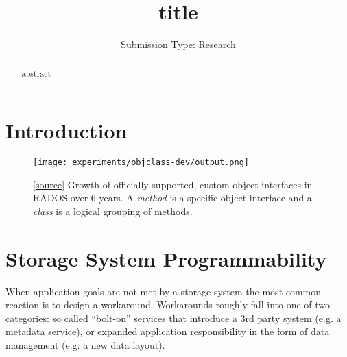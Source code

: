 \documentclass[10pt,twocolumn]{article}
\begin{document}
\title{title}

\author{
\small Submission Type: Research
}

\date{}
\maketitle

\begin{abstract}
abstract
\end{abstract}

\section{Introduction}

\begin{figure}[h]
  \centering
    \texttt{[image: experiments/objclass-dev/output.png]}
    \caption{
[\href{https://github.com/noahdesu/zlog-popper/tree/master/experiments/objclass-dev/visualize.ipynb}{source}]
Growth of officially supported, custom object interfaces in RADOS over 6
years. A \emph{method} is a specific object interface and a \emph{class} is a
logical grouping of methods.
}
\end{figure}

\section{Storage System Programmability}

When application goals are not met by a storage system the most common reaction
is to design a workaround. Workarounds roughly fall into one of two categories:
so called ``bolt-on'' services that introduce a 3rd party system (e.g. a
metadata service), or expanded application responsibility in the form of data
management (e.g. a new data layout).
\end{document}
